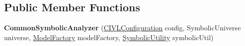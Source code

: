 \subsection*{Public Member Functions}
\begin{DoxyCompactItemize}
\item 
\hypertarget{classedu_1_1udel_1_1cis_1_1vsl_1_1civl_1_1semantics_1_1common_1_1CommonSymbolicAnalyzer_a047fecead7b9634bf8ea285db159b8ee}{}{\bfseries Common\+Symbolic\+Analyzer} (\hyperlink{classedu_1_1udel_1_1cis_1_1vsl_1_1civl_1_1config_1_1IF_1_1CIVLConfiguration}{C\+I\+V\+L\+Configuration} config, Symbolic\+Universe universe, \hyperlink{interfaceedu_1_1udel_1_1cis_1_1vsl_1_1civl_1_1model_1_1IF_1_1ModelFactory}{Model\+Factory} model\+Factory, \hyperlink{interfaceedu_1_1udel_1_1cis_1_1vsl_1_1civl_1_1dynamic_1_1IF_1_1SymbolicUtility}{Symbolic\+Utility} symbolic\+Util)\label{classedu_1_1udel_1_1cis_1_1vsl_1_1civl_1_1semantics_1_1common_1_1CommonSymbolicAnalyzer_a047fecead7b9634bf8ea285db159b8ee}


\end{DoxyCompactItemize}
